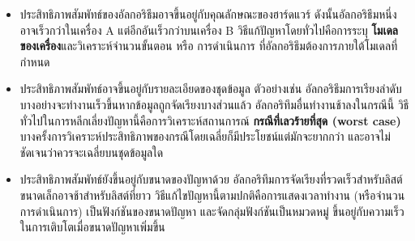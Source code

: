 \begin{itemize}


\item ประสิทธิภาพสัมพัทธ์ของอัลกอริธึมอาจขึ้นอยู่กับคุณลักษณะของฮาร์ดแวร์ 
ดังนั้นอัลกอริธึมหนึ่งอาจเร็วกว่าในเครื่อง A แต่อีกอันเร็วกว่าบนเครื่อง B 
วิธีแก้ปัญหาโดยทั่วไปคือการระบุ {\bf โมเดลของเครื่อง}และวิเคราะห์จำนวนขั้นตอน หรือ การดำเนินการ ที่อัลกอริธึมต้องการภายใต้โมเดลที่กำหนด


\item ประสิทธิภาพสัมพัทธ์อาจขึ้นอยู่กับรายละเอียดของชุดข้อมูล ตัวอย่างเช่น 
อัลกอริธึมการเรียงลำดับบางอย่างจะทำงานเร็วขึ้นหากข้อมูลถูกจัดเรียงบางส่วนแล้ว อัลกอริทึมอื่นทำงานช้าลงในกรณีนี้ 
วิธีทั่วไปในการหลีกเลี่ยงปัญหานี้คือการวิเคราะห์สถานการณ์ {\bf กรณีที่เลวร้ายที่สุด (worst case)} 
บางครั้งการวิเคราะห์ประสิทธิภาพของกรณีโดยเฉลี่ยก็มีประโยชน์แต่มักจะยากกว่า และอาจไม่ชัดเจนว่าควรจะเฉลี่ยบนชุดข้อมูลใด


\item ประสิทธิภาพสัมพัทธ์ยังขึ้นอยู่กับขนาดของปัญหาด้วย อัลกอริทึมการจัดเรียงที่รวดเร็วสำหรับลิสต์ขนาดเล็กอาจช้าสำหรับลิสต์ที่ยาว 
วิธีแก้ไขปัญหานี้ตามปกติคือการแสดงเวลาทำงาน (หรือจำนวนการดำเนินการ) เป็นฟังก์ชันของขนาดปัญหา และจัดกลุ่มฟังก์ชันเป็นหมวดหมู่ 
ขึ้นอยู่กับความเร็วในการเติบโตเมื่อขนาดปัญหาเพิ่มขึ้น

\end{itemize}

